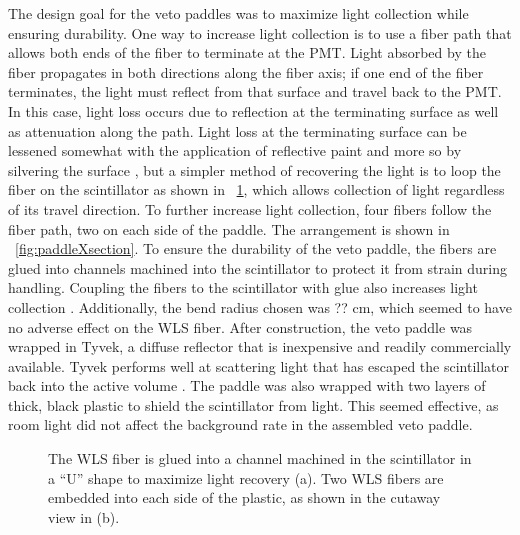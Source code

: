 The design goal for the veto paddles was to maximize light collection while ensuring durability.  One way to increase light collection is to use a fiber path that allows both ends of the fiber to terminate at the PMT.  Light absorbed by the fiber propagates in both directions along the fiber axis; if one end of the fiber terminates, the light must reflect from that surface and travel back to the PMT.  In this case, light loss occurs due to reflection at the terminating surface as well as attenuation along the path.  Light loss at the terminating surface can be lessened somewhat with the application of reflective paint and more so by silvering the surface \cite{WLS_mirrorFinish}, but a simpler method of recovering the light is to loop the fiber on the scintillator as shown in {\fig}~\ref{fig:paddle}, which allows collection of light regardless of its travel direction.  To further increase light collection, four fibers follow the fiber path, two on each side of the paddle.  The arrangement is shown in {\fig}~\ref{fig:paddleXsection}.  To ensure the durability of the veto paddle, the fibers are glued into channels machined into the scintillator to protect it from strain during handling.  Coupling the fibers to the scintillator with glue also increases light collection \cite{Aguillion_scintTiles}.  Additionally, the bend radius chosen was ?? cm, which seemed to have no adverse effect on the WLS fiber.  After construction, the veto paddle was wrapped in Tyvek, a diffuse reflector that is inexpensive and readily commercially available.  Tyvek performs well at scattering light that has escaped the scintillator back into the active volume \cite{YongWeiTyvek}.  The paddle was also wrapped with two layers of thick, black plastic to shield the scintillator from light.  This seemed effective, as room light did not affect the background rate in the assembled veto paddle.  
\begin{figure}[!htbp]
\centering
{}
\caption{The WLS fiber is glued into a channel machined in the scintillator in a ``U'' shape to maximize light recovery (a).  Two WLS fibers are embedded into each side of the plastic, as shown in the cutaway view in (b).}
\label{fig:paddle}
\end{figure}

